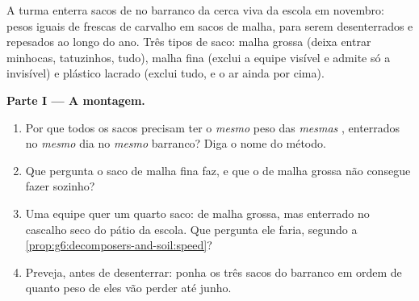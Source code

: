 \begin{problem}\label{pb:g6:decomposers-and-soil:1}
A turma enterra sacos de  no barranco da cerca viva da escola em
novembro: pesos iguais de  frescas de carvalho em sacos de
malha, para serem desenterrados e repesados ao longo do ano. Três
tipos de saco: malha grossa (deixa entrar minhocas, tatuzinhos, tudo),
malha fina (exclui a equipe visível e admite só a invisível) e
plástico lacrado (exclui tudo, e o ar ainda por cima).

\medskip\noindent\textbf{Parte I --- A montagem.}
\begin{enumerate}
  \item Por que todos os sacos precisam ter o \emph{mesmo} peso das
        \emph{mesmas} , enterrados no \emph{mesmo} dia no
        \emph{mesmo} barranco? Diga o nome do método.
  \item Que pergunta o saco de malha fina faz, e que o de malha
        grossa não consegue fazer sozinho?
  \item Uma equipe quer um quarto saco: de malha grossa, mas
        enterrado no cascalho seco do pátio da escola. Que pergunta
        ele faria, segundo a
        \cref{prop:g6:decomposers-and-soil:speed}?
  \item Preveja, antes de desenterrar: ponha os três sacos do
        barranco em ordem de quanto peso de  eles vão perder até
        junho.
\end{enumerate}


\end{problem}
